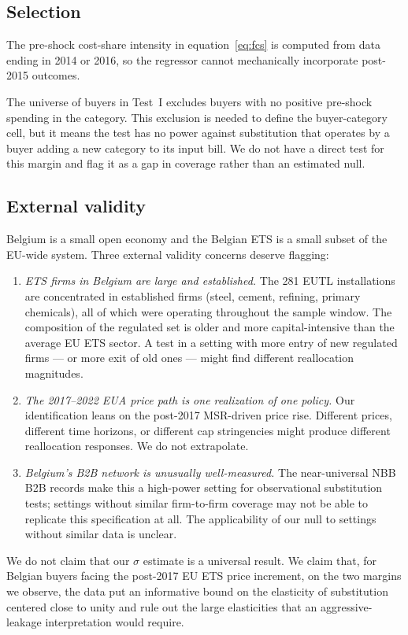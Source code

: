 \subsection{Selection}

The pre-shock cost-share intensity in equation~\eqref{eq:fcs} is computed from data ending in 2014 or 2016, so the regressor cannot mechanically incorporate post-2015 outcomes.

The universe of buyers in Test~I excludes buyers with no positive pre-shock spending in the category. This exclusion is needed to define the buyer-category cell, but it means the test has no power against substitution that operates by a buyer adding a new category to its input bill. We do not have a direct test for this margin and flag it as a gap in coverage rather than an estimated null.

\subsection{External validity}

Belgium is a small open economy and the Belgian ETS is a small subset of the EU-wide system. Three external validity concerns deserve flagging:

\begin{enumerate}
    \item \emph{ETS firms in Belgium are large and established.} The 281 EUTL installations are concentrated in established firms (steel, cement, refining, primary chemicals), all of which were operating throughout the sample window. The composition of the regulated set is older and more capital-intensive than the average EU ETS sector. A test in a setting with more entry of new regulated firms --- or more exit of old ones --- might find different reallocation magnitudes.

    \item \emph{The 2017--2022 EUA price path is one realization of one policy.} Our identification leans on the post-2017 MSR-driven price rise. Different prices, different time horizons, or different cap stringencies might produce different reallocation responses. We do not extrapolate.

    \item \emph{Belgium's B2B network is unusually well-measured.} The near-universal NBB B2B records make this a high-power setting for observational substitution tests; settings without similar firm-to-firm coverage may not be able to replicate this specification at all. The applicability of our null to settings without similar data is unclear.
\end{enumerate}

We do not claim that our $\sigma$ estimate is a universal result. We claim that, for Belgian buyers facing the post-2017 EU ETS price increment, on the two margins we observe, the data put an informative bound on the elasticity of substitution centered close to unity and rule out the large elasticities that an aggressive-leakage interpretation would require.
